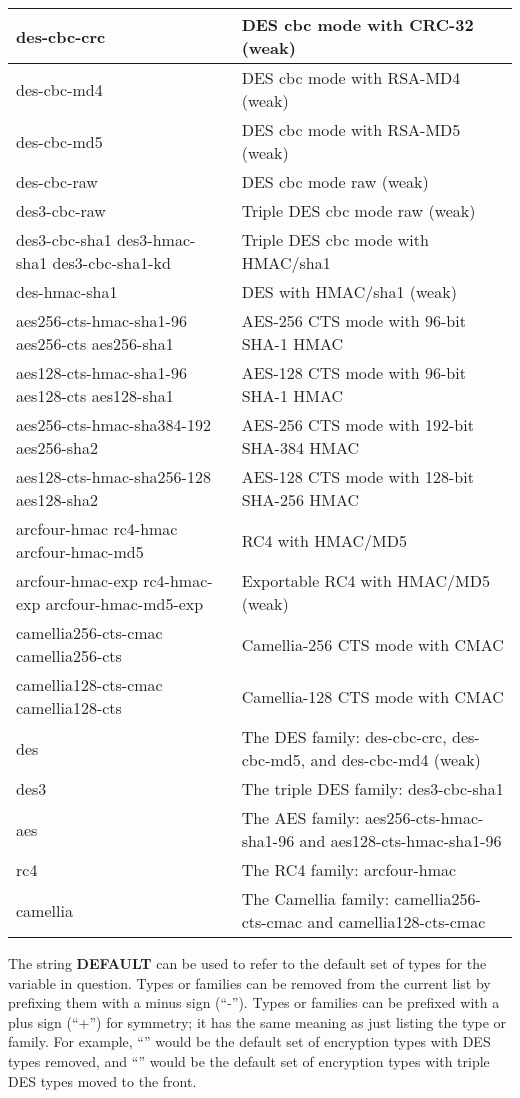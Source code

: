 \documentclass[letterpaper,10pt,english]{sphinxmanual}
\begin{document}
\begin{tabulary}{\linewidth}{|L|L|}
\hline

des-cbc-crc
 & 
DES cbc mode with CRC-32 (weak)
\\
\hline
des-cbc-md4
 & 
DES cbc mode with RSA-MD4 (weak)
\\
\hline
des-cbc-md5
 & 
DES cbc mode with RSA-MD5 (weak)
\\
\hline
des-cbc-raw
 & 
DES cbc mode raw (weak)
\\
\hline
des3-cbc-raw
 & 
Triple DES cbc mode raw (weak)
\\
\hline
des3-cbc-sha1 des3-hmac-sha1 des3-cbc-sha1-kd
 & 
Triple DES cbc mode with HMAC/sha1
\\
\hline
des-hmac-sha1
 & 
DES with HMAC/sha1 (weak)
\\
\hline
aes256-cts-hmac-sha1-96 aes256-cts aes256-sha1
 & 
AES-256 CTS mode with 96-bit SHA-1 HMAC
\\
\hline
aes128-cts-hmac-sha1-96 aes128-cts aes128-sha1
 & 
AES-128 CTS mode with 96-bit SHA-1 HMAC
\\
\hline
aes256-cts-hmac-sha384-192 aes256-sha2
 & 
AES-256 CTS mode with 192-bit SHA-384 HMAC
\\
\hline
aes128-cts-hmac-sha256-128 aes128-sha2
 & 
AES-128 CTS mode with 128-bit SHA-256 HMAC
\\
\hline
arcfour-hmac rc4-hmac arcfour-hmac-md5
 & 
RC4 with HMAC/MD5
\\
\hline
arcfour-hmac-exp rc4-hmac-exp arcfour-hmac-md5-exp
 & 
Exportable RC4 with HMAC/MD5 (weak)
\\
\hline
camellia256-cts-cmac camellia256-cts
 & 
Camellia-256 CTS mode with CMAC
\\
\hline
camellia128-cts-cmac camellia128-cts
 & 
Camellia-128 CTS mode with CMAC
\\
\hline
des
 & 
The DES family: des-cbc-crc, des-cbc-md5, and des-cbc-md4 (weak)
\\
\hline
des3
 & 
The triple DES family: des3-cbc-sha1
\\
\hline
aes
 & 
The AES family: aes256-cts-hmac-sha1-96 and aes128-cts-hmac-sha1-96
\\
\hline
rc4
 & 
The RC4 family: arcfour-hmac
\\
\hline
camellia
 & 
The Camellia family: camellia256-cts-cmac and camellia128-cts-cmac
\\
\hline\end{tabulary}


The string \textbf{DEFAULT} can be used to refer to the default set of
types for the variable in question.  Types or families can be removed
from the current list by prefixing them with a minus sign (``-'').
Types or families can be prefixed with a plus sign (``+'') for symmetry;
it has the same meaning as just listing the type or family.  For
example, ``'' would be the default set of encryption
types with DES types removed, and ``'' would be the
default set of encryption types with triple DES types moved to the
front.
\end{document}
